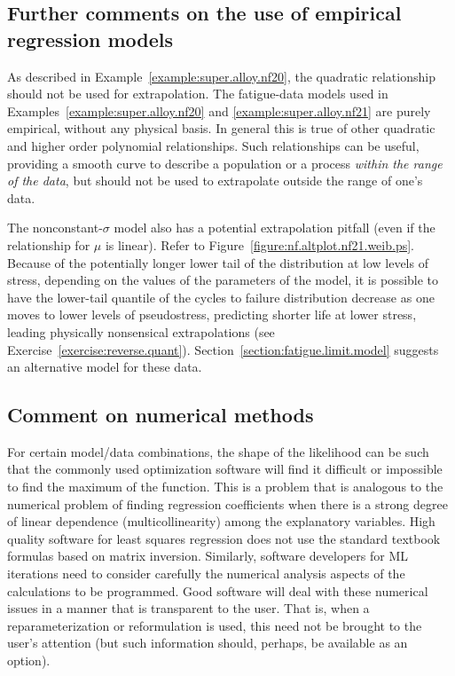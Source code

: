 \subsection{Further comments on the use of empirical regression models}
As described in Example~\ref{example:super.alloy.nf20}, the quadratic
relationship should not be used for extrapolation.  The 
fatigue-data models used in
Examples~\ref{example:super.alloy.nf20} and
\ref{example:super.alloy.nf21} are purely empirical, without any
physical basis. In general this is true of other quadratic and higher
order polynomial relationships. Such relationships 
can be useful, providing a smooth
curve to describe a population or a process {\em within the range of
the data}, but should not be used to extrapolate outside the
range of one's data.

The nonconstant-$\sigma$ model also has a potential extrapolation
pitfall (even if the relationship for $\mu$ is linear).  Refer to
Figure~\ref{figure:nf.altplot.nf21.weib.ps}.  Because of the
potentially longer lower tail of the distribution at low levels of
stress, depending on the values of the parameters of the model, it is
possible to have the lower-tail quantile of the cycles to failure
distribution decrease as one moves to lower levels of pseudostress,
predicting shorter life at lower stress, leading physically
nonsensical extrapolations (see
Exercise~\ref{exercise:reverse.quant}).
Section~\ref{section:fatigue.limit.model} suggests an alternative
model for these data.

\subsection{Comment on numerical methods}
\label{section:numerical.methods}
For certain model/data combinations, the shape of the likelihood can
be such that the commonly used optimization software will find it
difficult or impossible to find the maximum of the function.  This
is a problem that is analogous to the numerical problem of finding
regression coefficients when there is a strong degree of linear
dependence (multicollinearity) among the explanatory variables.
High quality software for least squares regression does not use the
standard textbook formulas based on matrix inversion.  Similarly,
software developers for ML iterations need to consider carefully the
numerical analysis aspects of the calculations to be
programmed. Good software will deal with these numerical issues in a
manner that is transparent to the user.  That is, when a
reparameterization or reformulation is used, this need not be
brought to the user's attention (but such information
should, perhaps, be available as
an option).


